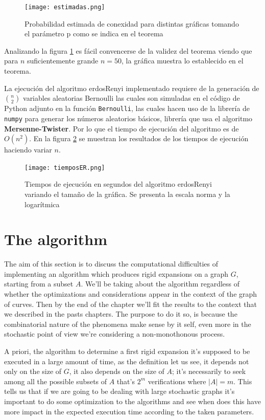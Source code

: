 \begin{figure}[h!]
	\centering
	\texttt{[image: estimadas.png]}
	\caption{Probabilidad estimada de conexidad para distintas gráficas tomando el parámetro p como se indica en el teorema}
	\label{fig:Estimadas}
\end{figure}

Analizando la figura \ref{fig:Estimadas} es fácil convencerse de la validez del teorema viendo que para $n$ suficientemente grande $n=50$, la gráfica muestra lo establecido en el teorema.

La ejecución del algoritmo erdosRenyi implementado requiere de la generación de $\binom{n}{2}$ variables aleatorias Bernoulli las cuales son simuladas en el código de Python adjunto en la función \texttt{Bernoulli}, las cuales hacen uso de la librería de \texttt{numpy} para generar los números aleatorios básicos, librería que usa el algoritmo \textbf{Mersenne-Twister}. Por lo que el tiempo de ejecución del algoritmo es de $O(n^{2})$. En la figura \ref{fig:tiemposER} se muestran los resultados de los tiempos de ejecución haciendo variar $n$.

\begin{figure}[h!]
	\centering
	\texttt{[image: tiemposER.png]}
	\caption{Tiempos de ejecución en segundos del algoritmo erdosRenyi variando el tamaño de la gráfica. Se presenta la escala norma y la logarítmica}
	\label{fig:tiemposER}
\end{figure}



\section{The algorithm}
The aim of this section is to discuss the computational difficulties of implementing an algorithm which produces rigid expansions on a graph $G$, starting from a subset $A$. We'll be taking about the algorithm regardless of whether the optimizations and considerations appear in the context of the graph of curves. Then by the end of the chapter we'll fit the results to the context that we described in the pasts chapters. The purpose to do it so, is because the combinatorial nature of the phenomena make sense by it self, even more in the stochastic point of view we're considering a non-monothonous process.

A priori, the algorithm to determine a first rigid expansion it's supposed to be executed in a large amount of time, as the definition let us see, it depends not only on the size of $G$, it also depends on the size of $A$; it's necessarily to seek among all the possible subsets of $A$ that's $2^{m}$ verifications where $|A| = m$. This tells us that if we are going to be dealing with large stochastic graphs it's important to do some optimization to the algorithms and see when does this have more impact in the expected execution time according to the taken parameters.

